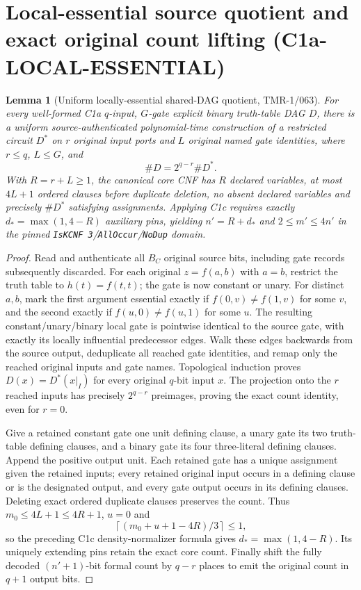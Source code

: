 \documentclass[11pt]{article}
\newtheorem{lemma}{Lemma}
\begin{document}
\section{Local-essential source quotient and exact original count lifting (C1a-LOCAL-ESSENTIAL)}
\begin{lemma}[Uniform locally-essential shared-DAG quotient, TMR-1/063]
For every well-formed C1a $q$-input, $G$-gate explicit binary
truth-table DAG $D$, there is a uniform source-authenticated
polynomial-time construction of a restricted circuit $D^*$ on
$r$ original input ports and $L$ original named gate identities,
where $r\le q$, $L\le G$, and
\[
\boxed{\#D=2^{q-r}\#D^*.}
\]
With $R=r+L\ge1$, the canonical core CNF has $R$ declared variables,
at most $4L+1$ ordered clauses before duplicate deletion,
no absent declared variables and precisely $\#D^*$ satisfying
assignments. Applying C1c requires exactly
$d_*=\max(1,4-R)$ auxiliary pins, yielding
$n'=R+d_*$ and $2\le m'\le4n'$ in the pinned
\texttt{IsKCNF 3}/\texttt{AllOccur}/\texttt{NoDup} domain.
\end{lemma}
\begin{proof}
Read and authenticate all $B_C$ original source bits, including
gate records subsequently discarded. For each original
$z=f(a,b)$ with $a=b$, restrict the truth table to
$h(t)=f(t,t)$; the gate is now constant or unary.
For distinct $a,b$, mark the first argument essential
exactly if $f(0,v)\ne f(1,v)$ for some $v$, and the second
exactly if $f(u,0)\ne f(u,1)$ for some $u$.
The resulting constant/unary/binary local gate is pointwise
identical to the source gate, with exactly its locally
influential predecessor edges. Walk these edges backwards
from the source output, deduplicate all reached gate identities,
and remap only the reached original inputs and gate names.
Topological induction proves $D(x)=D^*(x|_I)$ for every
original $q$-bit input $x$. The projection onto the $r$
reached inputs has precisely $2^{q-r}$ preimages,
proving the exact count identity, even for $r=0$.

Give a retained constant gate one unit defining clause,
a unary gate its two truth-table defining clauses, and
a binary gate its four three-literal defining clauses.
Append the positive output unit. Each retained gate has
a unique assignment given the retained inputs; every
retained original input occurs in a defining clause or
is the designated output, and every gate output occurs
in its defining clauses. Deleting exact ordered duplicate
clauses preserves the count. Thus $m_0\le4L+1\le4R+1$,
$u=0$ and
\[
\left\lceil(m_0+u+1-4R)/3\right\rceil\le1,
\]
so the preceding C1c density-normalizer formula gives
$d_*=\max(1,4-R)$. Its uniquely extending pins retain
the exact core count. Finally shift the fully decoded
$(n'+1)$-bit formal count by $q-r$ places to emit the
original count in $q+1$ output bits.
\end{proof}
\end{document}
